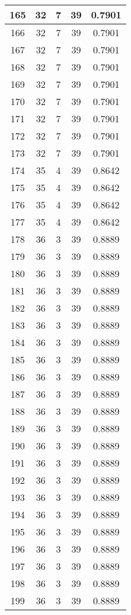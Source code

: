 \documentclass[letterpaper, 12pt]{article}
\begin{document}
\begin{longtable}{|c|c|c|c|c|}
\hline
165 & 32 & 7 & 39 & 0.7901 \\
\hline
166 & 32 & 7 & 39 & 0.7901 \\
\hline
167 & 32 & 7 & 39 & 0.7901 \\
\hline
168 & 32 & 7 & 39 & 0.7901 \\
\hline
169 & 32 & 7 & 39 & 0.7901 \\
\hline
170 & 32 & 7 & 39 & 0.7901 \\
\hline
171 & 32 & 7 & 39 & 0.7901 \\
\hline
172 & 32 & 7 & 39 & 0.7901 \\
\hline
173 & 32 & 7 & 39 & 0.7901 \\
\hline
174 & 35 & 4 & 39 & 0.8642 \\
\hline
175 & 35 & 4 & 39 & 0.8642 \\
\hline
176 & 35 & 4 & 39 & 0.8642 \\
\hline
177 & 35 & 4 & 39 & 0.8642 \\
\hline
178 & 36 & 3 & 39 & 0.8889 \\
\hline
179 & 36 & 3 & 39 & 0.8889 \\
\hline
180 & 36 & 3 & 39 & 0.8889 \\
\hline
181 & 36 & 3 & 39 & 0.8889 \\
\hline
182 & 36 & 3 & 39 & 0.8889 \\
\hline
183 & 36 & 3 & 39 & 0.8889 \\
\hline
184 & 36 & 3 & 39 & 0.8889 \\
\hline
185 & 36 & 3 & 39 & 0.8889 \\
\hline
186 & 36 & 3 & 39 & 0.8889 \\
\hline
187 & 36 & 3 & 39 & 0.8889 \\
\hline
188 & 36 & 3 & 39 & 0.8889 \\
\hline
189 & 36 & 3 & 39 & 0.8889 \\
\hline
190 & 36 & 3 & 39 & 0.8889 \\
\hline
191 & 36 & 3 & 39 & 0.8889 \\
\hline
192 & 36 & 3 & 39 & 0.8889 \\
\hline
193 & 36 & 3 & 39 & 0.8889 \\
\hline
194 & 36 & 3 & 39 & 0.8889 \\
\hline
195 & 36 & 3 & 39 & 0.8889 \\
\hline
196 & 36 & 3 & 39 & 0.8889 \\
\hline
197 & 36 & 3 & 39 & 0.8889 \\
\hline
198 & 36 & 3 & 39 & 0.8889 \\
\hline
199 & 36 & 3 & 39 & 0.8889 \\
\hline
\end{longtable}
\end{document}
